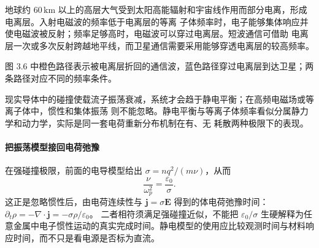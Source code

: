 地球约 $60\,\mathrm{km}$ 以上的高层大气受到太阳高能辐射和宇宙线作用而部分电离，形成电离层。入射电磁波的频率低于电离层的等离
子体频率时，电子能够集体响应并使电磁波被反射；频率足够高时，电磁波可以穿过电离层。短波通信可借助
电离层一次或多次反射跨越地平线，而卫星通信需要采用能够穿透电离层的较高频率。

图 3.6 中橙色路径表示被电离层折回的通信波，蓝色路径穿过电离层到达卫星；两条路径对应不同的频率条件。

\ionosphereFigure
{}

现实导体中的碰撞使载流子振荡衰减，系统才会趋于静电平衡；在高频电磁场或等离子体中，惯性和集体振荡
则不能忽略。静电平衡与等离子体频率看似分属静力学和动力学，实际是同一套电荷重新分布机制在有、无
耗散两种极限下的表现。

\paragraph{把振荡模型接回电荷弛豫}
在强碰撞极限，前面的电导模型给出 $\sigma=nq^2/(m\nu)$，从而
\[
 \frac{\nu}{\omega_p^2}=\frac{\varepsilon_0}{\sigma}.
\]
这正是忽略惯性后，由电荷连续性与 $\boldsymbol j=\sigma\boldsymbol E$ 得到的体电荷弛豫时间：
$\partial_t\rho=-\nabla\cdot\boldsymbol j=-\sigma\rho/\varepsilon_0$。
二者相符须满足强碰撞近似，不能把 $\varepsilon_0/\sigma$ 生硬解释为任意金属中电子惯性运动的真实完成时间。静电模型的使用应比较观测时间与材料响应时间，而不只是看电源是否标为直流。

